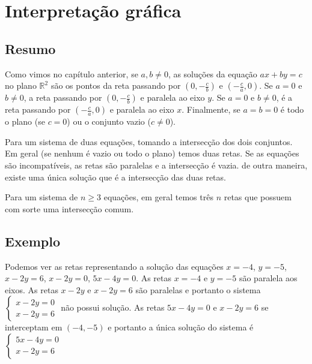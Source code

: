 \section{Interpretação gráfica}

\subsection*{Resumo}

Como vimos no capítulo anterior,
se $a,b \neq 0$, as soluções da equação $ax+by=c$ no plano
${\mathbb R}^2$ são os pontos da reta passando por $(0, -\frac{c}{b})$ e
$(-\frac{c}{a}, 0)$. Se $a = 0$ e $b \neq 0$, a reta passando por
$(0, -\frac{c}{b})$ e paralela ao eixo $y$. Se $a = 0$ e $b \neq 0$, é a reta
passando por $(-\frac{c}{a}, 0)$ e paralela ao eixo $x$. Finalmente, se
$a = b = 0$ é todo o plano (se $c = 0$) ou o conjunto vazio ($c \neq 0$).

Para um sistema de duas equações, tomando a intersecção dos dois conjuntos.
Em geral (se nenhum é vazio ou todo o plano) temos duas retas. Se as equações
são incompatíveis, as retas são paralelas e a intersecção é vazia.
de outra maneira, existe uma única solução que é a intersecção das duas retas.

Para um sistema de $n \geq 3$ equações, em geral temos três $n$ retas que
possuem com sorte uma intersecção comum.

\subsection*{Exemplo}

Podemos ver as retas representando a solução das equações
$x=-4$, $y=-5$, $x-2y=6$, $x-2y=0$, $5x-4y=0$. As retas $x=-4$ e $y = -5$ são
paralela aos eixos. As retas $x - 2y$ e $x - 2y = 6$ são paralelas e
portanto o sistema $\left\{\begin{aligned}
   x-2y=0 \\
  x-2y=6
\end{aligned}\right.$ não possui solução. As retas $5x - 4y = 0$ e
$x - 2y = 6$ se interceptam em $(-4, -5)$ e portanto a única solução do sistema
é $\left\{\begin{aligned}
   5x-4y=0 \\
  x-2y=6
\end{aligned}\right.$

\begin{center}
\end{center}

